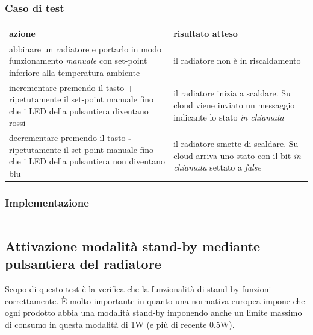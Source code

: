 \documentclass[12pt,a4paper,twoside,titlepage]{book}
\begin{document}
\subsubsection{Caso di test}
\begin{center}
\begin{tabular}{| p{} | p{} |}
    \hline
    \textbf{azione} & \textbf{risultato atteso} \\ \hline
    abbinare un radiatore e portarlo in modo funzionamento \textit{manuale} con set-point inferiore alla temperatura ambiente & il radiatore non è in riscaldamento \\ \hline
    incrementare premendo il tasto \textbf{+} ripetutamente il set-point manuale fino che i LED della pulsantiera diventano rossi & il radiatore inizia a scaldare. Su cloud viene inviato un messaggio indicante lo stato \textit{in chiamata} \\ \hline
    decrementare premendo il tasto \textbf{-} ripetutamente il set-point manuale fino che i LED della pulsantiera non diventano blu & il radiatore smette di scaldare. Su cloud arriva uno stato con il bit \textit{in chiamata} settato a \textit{false} \\ \hline
\end{tabular}
\end{center}

\subsubsection{Implementazione}
\inputminted{python3}{src/test_thermoregulation.py}

\subsection{Attivazione modalità stand-by mediante pulsantiera del radiatore}

Scopo di questo test è la verifica che la funzionalità di stand-by funzioni correttamente.
È molto importante in quanto una normativa europea impone che ogni prodotto abbia una
modalità stand-by imponendo anche un limite massimo di consumo in questa modalità di 1W
(e più di recente 0.5W).
\end{document}

